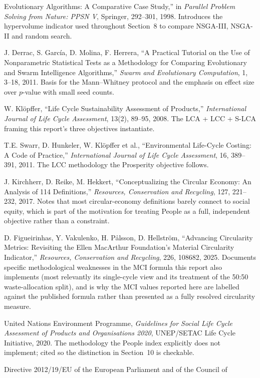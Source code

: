 \documentclass[11pt,a4paper]{article}
\begin{document}
\begin{enumerate}[label={[\arabic*]}]
Evolutionary Algorithms: A Comparative Case Study,'' in \emph{Parallel
Problem Solving from Nature: PPSN V}, Springer, 292--301, 1998.
Introduces the hypervolume indicator used throughout Section~8 to compare
NSGA-III, NSGA-II and random search.
\item J. Derrac, S. Garc\'ia, D. Molina, F. Herrera, ``A Practical Tutorial
on the Use of Nonparametric Statistical Tests as a Methodology for Comparing
Evolutionary and Swarm Intelligence Algorithms,'' \emph{Swarm and
Evolutionary Computation}, 1, 3--18, 2011. Basis for the Mann--Whitney
protocol and the emphasis on effect size over $p$-value with small seed
counts.
\item W. Kl\"opffer, ``Life Cycle Sustainability Assessment of Products,''
\emph{International Journal of Life Cycle Assessment}, 13(2), 89--95, 2008.
The LCA + LCC + S-LCA framing this report's three objectives instantiate.
\item T.E. Swarr, D. Hunkeler, W. Kl\"opffer et al., ``Environmental
Life-Cycle Costing: A Code of Practice,'' \emph{International Journal of
Life Cycle Assessment}, 16, 389--391, 2011. The LCC methodology the
Prosperity objective follows.
\item J. Kirchherr, D. Reike, M. Hekkert, ``Conceptualizing the Circular
Economy: An Analysis of 114 Definitions,'' \emph{Resources, Conservation and
Recycling}, 127, 221--232, 2017. Notes that most circular-economy
definitions barely connect to social equity, which is part of the motivation
for treating People as a full, independent objective rather than a
constraint.
\item D. Figueirinhas, Y. Vakulenko, H. P\r{a}lsson, D. Hellstr\"om,
``Advancing Circularity Metrics: Revisiting the Ellen MacArthur Foundation's
Material Circularity Indicator,'' \emph{Resources, Conservation and
Recycling}, 226, 108682, 2025. Documents specific methodological weaknesses
in the MCI formula this report also implements (most relevantly its
single-cycle view and its treatment of the 50:50 waste-allocation split),
and is why the MCI values reported here are labelled against the published
formula rather than presented as a fully resolved circularity measure.
\item United Nations Environment Programme, \emph{Guidelines for Social Life
Cycle Assessment of Products and Organisations 2020}, UNEP/SETAC Life Cycle
Initiative, 2020. The methodology the People index explicitly does not
implement; cited so the distinction in Section~10 is checkable.
\item Directive 2012/19/EU of the European Parliament and of the Council of

\end{enumerate}
\end{document}
